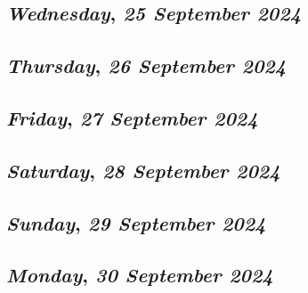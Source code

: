 \def\day{\textit{25 September 2024}}
\def\weekday{\textit{Wednesday}}
\subsection*{\weekday, \day}

\def\day{\textit{26 September 2024}}
\def\weekday{\textit{Thursday}}
\subsection*{\weekday, \day}

\def\day{\textit{27 September 2024}}
\def\weekday{\textit{Friday}}
\subsection*{\weekday, \day}

\def\day{\textit{28 September 2024}}
\def\weekday{\textit{Saturday}}
\subsection*{\weekday, \day}

\def\day{\textit{29 September 2024}}
\def\weekday{\textit{Sunday}}
\subsection*{\weekday, \day}

\def\day{\textit{30 September 2024}}
\def\weekday{\textit{Monday}}
\subsection*{\weekday, \day}